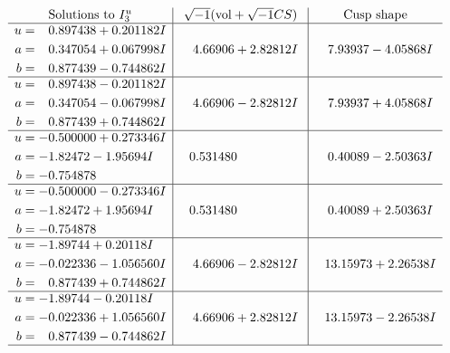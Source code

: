 \documentclass[1p]{elsarticle_modified}
\theoremstyle{definition}
\newcommand{\I}{\sqrt{-1}}
\begin{document}
$$\begin{array}{c|c|c}  
\text{Solutions to }I^u_{3}& \I (\text{vol} + \sqrt{-1}CS) & \text{Cusp shape}\\
 \hline 
\begin{aligned}
u &= \phantom{-}0.897438 + 0.201182 I \\
a &= \phantom{-}0.347054 + 0.067998 I \\
b &= \phantom{-}0.877439 - 0.744862 I\end{aligned}
 & \phantom{-}4.66906 + 2.82812 I & \phantom{-}7.93937 - 4.05868 I \\ \hline\begin{aligned}
u &= \phantom{-}0.897438 - 0.201182 I \\
a &= \phantom{-}0.347054 - 0.067998 I \\
b &= \phantom{-}0.877439 + 0.744862 I\end{aligned}
 & \phantom{-}4.66906 - 2.82812 I & \phantom{-}7.93937 + 4.05868 I \\ \hline\begin{aligned}
u &= -0.500000 + 0.273346 I \\
a &= -1.82472 - 1.95694 I \\
b &= -0.754878\phantom{ +0.000000I}\end{aligned}
 & \phantom{-}0.531480\phantom{ +0.000000I} & \phantom{-}0.40089 - 2.50363 I \\ \hline\begin{aligned}
u &= -0.500000 - 0.273346 I \\
a &= -1.82472 + 1.95694 I \\
b &= -0.754878\phantom{ +0.000000I}\end{aligned}
 & \phantom{-}0.531480\phantom{ +0.000000I} & \phantom{-}0.40089 + 2.50363 I \\ \hline\begin{aligned}
u &= -1.89744 + 0.20118 I \\
a &= -0.022336 - 1.056560 I \\
b &= \phantom{-}0.877439 + 0.744862 I\end{aligned}
 & \phantom{-}4.66906 - 2.82812 I & \phantom{-}13.15973 + 2.26538 I \\ \hline\begin{aligned}
u &= -1.89744 - 0.20118 I \\
a &= -0.022336 + 1.056560 I \\
b &= \phantom{-}0.877439 - 0.744862 I\end{aligned}
 & \phantom{-}4.66906 + 2.82812 I & \phantom{-}13.15973 - 2.26538 I\\
 \hline 
 \end{array}$$\newpage
\end{document}
